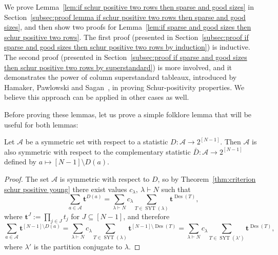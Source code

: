 \documentclass[ALCO]{cedram}
\newcommand{\Des}{\operatorname{Des}}
\newcommand{\Syt}{\operatorname{SYT}}
\newcommand{\A}{\mathcal{A}}
\begin{document}
We prove Lemma~\ref{lem:if schur positive two rows then sparse and good sizes} in Section~\ref{subsec:proof lemma if schur positive two rows then sparse and good sizes}, and then show two proofs for Lemma~\ref{lem:if sparse and good sizes then schur positive two rows}. The first proof (presented in Section~\ref{subsec:proof if sparse and good sizes then schur positive two rows by induction}) is inductive. The second proof (presented in Section~\ref{subsec:proof if sparse and good sizes then schur positive two rows by superstandard}) is more involved, and it demonstrates the power of column superstandard tableaux, introduced by Hamaker, Pawlowski and Sagan~\cite{S3_patterns_list}, in proving Schur-positivity properties. We believe this approach can be applied in other cases as well.

Before proving these lemmas, let us prove a simple folklore lemma that will be useful for both lemmas:
\begin{lemma}
\label{lem:symmetric complement is symmetric}
    Let $\A$ be a symmetric set with respect to a statistic $D:\A \to 2^{[N-1]}$. Then $\A$ is also symmetric with respect to the complementary statistic $\bar{D}:\A \to 2^{[N-1]}$ defined by $a \mapsto [N-1]\setminus D(a)$.
\end{lemma}
\begin{proof}
    The set $\A$ is symmetric with respect to $D$, so by Theorem~\ref{thm:criterion schur positive young} there exist values $c_{\lambda},\ \lambda \vdash N$ such that
    \[
        \sum_{a \in \A} \boldsymbol{t}^{D(a)} = \sum_{\lambda \vdash N} c_\lambda \sum_{T \in \Syt(\lambda)} \boldsymbol{t}^{\Des(T)},
    \]
    where $\boldsymbol{t}^J := \prod_{j \in J} t_j$ for $J \subseteq [N-1]$, and therefore
    \[
        \sum_{a \in \A} \boldsymbol{t}^{[N-1]\setminus D(a)} = \sum_{\lambda \vdash N} c_\lambda \sum_{T \in \Syt(\lambda)} \boldsymbol{t}^{[N-1]\setminus \Des(T)} = \sum_{\lambda \vdash N} c_\lambda \sum_{T \in \Syt(\lambda')} \boldsymbol{t}^{\Des(T)},
    \]
    where $\lambda'$ is the partition conjugate to $\lambda$.
\end{proof}
\end{document}
